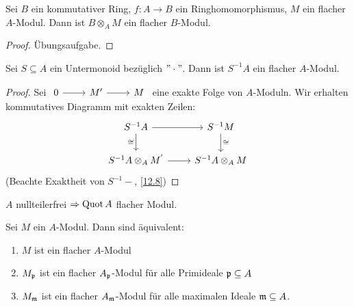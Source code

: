 \begin{bem} \label{13.21}
	Sei $B$ ein kommutativer Ring, $f: A \to B $ ein Ringhomomorphismus, $M$ ein flacher $A$-Modul. Dann ist $ B \otimes_A M $ ein flacher $B$-Modul. 
\end{bem}
\begin{proof}
	Übungsaufgabe.
\end{proof}
\begin{bem} \label{13.22}
	Sei $S \subseteq A $ ein Untermonoid bezüglich $ "\cdot " $. Dann ist $S^{-1}A $ ein flacher $A$-Modul. 
\end{bem}
\begin{proof}
	Sei $\begin{tikzcd} 0 \arrow{r} & M' \arrow{r} & M \end{tikzcd}$ eine exakte Folge von $A$-Moduln. Wir erhalten kommutatives Diagramm mit exakten Zeilen: 
	$$\begin{tikzcd}
	S^{-1}A \arrow[swap]{d}{\cong}\arrow{r} &  S^{-1}M \arrow{d}{\cong} \\
	S^{-1}A \otimes_A M^{'} \arrow{r} & S^{-1}A \otimes_A M
	\end{tikzcd}$$
	(Beachte Exaktheit von $S^{-1}-$, \ref{12.8})
\end{proof}
\begin{anm}
	$A$ nullteilerfrei $\Rightarrow \operatorname{Quot} A $ flacher Modul.
\end{anm}
\begin{bem} \label{13.23}
	Sei $M$ ein $A$-Modul. Dann sind äquivalent: 
	\begin{enumerate} [label= \roman*)]
		\item $M$ ist ein flacher $A$-Modul 
		\item $M_{\mathfrak{p}} $ ist ein flacher $A_{\mathfrak{p}}$-Modul für alle Primideale $\mathfrak{p} \subseteq A$
		\item $M_{\mathfrak{m}}$ ist ein flacher $A_{\mathfrak{m}}$-Modul für alle maximalen Ideale $\mathfrak{m} \subseteq A$. 
		
	\end{enumerate}
\end{bem}
